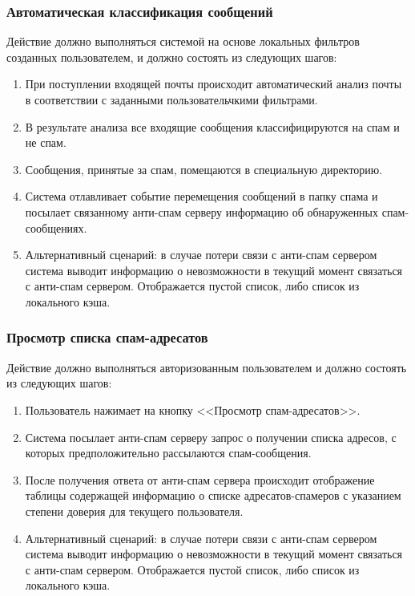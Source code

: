 \subsubsection*{Автоматическая классификация сообщений}
Действие должно выполняться системой на основе локальных фильтров созданных пользователем, и должно состоять из следующих шагов:

\begin{enumerate}
  \item При поступлении входящей почты происходит автоматический анализ почты в соответствии с заданными пользовательчкими фильтрами.
  \item В результате анализа все входящие сообщения классифицируются на спам и не спам.
  \item Сообщения, принятые за спам, помещаются в специальную директорию.
  \item Система отлавливает событие перемещения сообщений в папку спама и посылает связанному анти-спам серверу информацию об обнаруженных спам-сообщениях.
  \item Альтернативный сценарий: в случае потери связи с анти-спам сервером система выводит информацию о невозможности в текущий момент связаться с анти-спам сервером. Отображается пустой список, либо список из локального кэша.
\end{enumerate}

\subsubsection*{Просмотр списка спам-адресатов}
Действие должно выполняться авторизованным пользователем и должно состоять из следующих шагов:

\begin{enumerate}
  \item Пользователь нажимает на кнопку <<Просмотр спам-адресатов>>.
  \item Система посылает анти-спам серверу запрос о получении списка адресов, с которых предположительно рассылаются спам-сообщения.
  \item После получения ответа от анти-спам сервера происходит отображение таблицы содержащей информацию о списке адресатов-спамеров с указанием степени  доверия для текущего пользователя.
  \item Альтернативный сценарий: в случае потери связи с анти-спам сервером система выводит информацию о невозможности в текущий момент связаться с анти-спам сервером. Отображается пустой список, либо список из локального кэша.
\end{enumerate}


